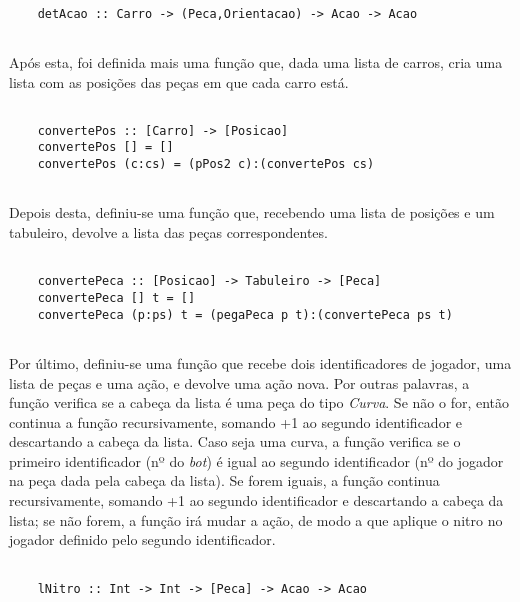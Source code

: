 \documentclass[a4paper]{report} %
\begin{document}
  \begin{verbatim}
      
    detAcao :: Carro -> (Peca,Orientacao) -> Acao -> Acao  
      
  \end{verbatim}
  
  \newpage
  
  \par \noindent Após esta, foi definida mais uma função que, dada uma lista de carros, cria uma lista com as posições das peças em que cada carro está.
  
  \begin{verbatim}
      
    convertePos :: [Carro] -> [Posicao]
    convertePos [] = []
    convertePos (c:cs) = (pPos2 c):(convertePos cs)  
      
  \end{verbatim}
  
  \par \noindent Depois desta, definiu-se uma função que, recebendo uma lista de posições e um tabuleiro, devolve a lista das peças correspondentes.
  
  \begin{verbatim}
      
    convertePeca :: [Posicao] -> Tabuleiro -> [Peca]
    convertePeca [] t = []
    convertePeca (p:ps) t = (pegaPeca p t):(convertePeca ps t)  
      
  \end{verbatim}
  
  \par \noindent Por último, definiu-se uma função que recebe dois identificadores de jogador, uma lista de peças e uma ação, e devolve uma ação nova. Por outras palavras, a função verifica se a cabeça da lista é uma peça do tipo \textit{Curva}. Se não o for, então continua a função recursivamente, somando +1 ao segundo identificador e descartando a cabeça da lista. Caso seja uma curva, a função verifica se o primeiro identificador (nº do \textit{bot}) é igual ao segundo identificador (nº do jogador na peça dada pela cabeça da lista). Se forem iguais, a função continua recursivamente, somando +1 ao segundo identificador e descartando a cabeça da lista; se não forem, a função irá mudar a ação, de modo a que aplique o nitro no jogador definido pelo segundo identificador.
  
  \begin{verbatim}
      
    lNitro :: Int -> Int -> [Peca] -> Acao -> Acao  
      
  \end{verbatim}
  
\end{document}
